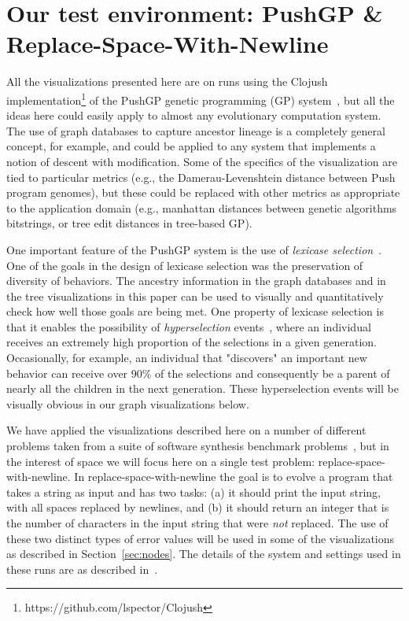 \documentclass{sig-alternate}
\begin{document}
\section{Our test environment: PushGP \& Replace-Space-With-Newline}
\label{sec:RSWN}

All the visualizations presented here are on runs using the Clojush
implementation\footnote{https://github.com/lspector/Clojush} of the 
PushGP genetic programming (GP) system~\cite{spector:2002:GPEM, 1068292}, 
but all the ideas here
could easily apply to almost any evolutionary computation system. The use
of graph databases to capture ancestor lineage is a completely general
concept, for example, and could be applied to any system that implements a
notion of descent with modification. Some of the specifics of the visualization
are tied to particular metrics (e.g., the Damerau-Levenshtein distance
between Push program genomes), but these could be replaced with other
metrics as appropriate to the application domain (e.g., manhattan distances
between genetic algorithms bitstrings, or tree edit distances in
tree-based GP).

One important feature of the PushGP system is the use of \emph{lexicase
selection}~\cite{Helmuth:2015:ieeeTEC}. One of the goals in the design of
lexicase selection was the preservation of diversity of behaviors. The
ancestry information in the graph databases and in the tree visualizations 
in this paper can be used to visually and quantitatively check how
well those goals are being met. One property of lexicase selection is
that it enables the possibility of \emph{hyperselection} events~\cite{Helmuth:2016:GECCO},
where an individual receives an extremely high proportion of the selections
in a given generation. Occasionally, for example, an individual that
"discovers" an important new behavior can receive over 90\% of the selections
and consequently be a parent of nearly all the children in the next generation.
These hyperselection events will be visually obvious in our graph visualizations
below.

We have applied the visualizations described here on a 
number of different problems taken from a suite of software synthesis benchmark 
problems~\cite{Helmuth:2015:GECCO}, but in the interest of space we
will focus here on a single test problem: replace-space-with-newline.
In replace-space-with-newline the goal is to evolve a program that takes a string
as input and has two tasks: (a) it should print the input string, with all spaces
replaced by newlines, and (b) it should return an integer that is the number of
characters in the input string that were \emph{not} replaced. The use of
these two distinct types of error values will be used in some of the visualizations
as described in Section~\ref{sec:nodes}. The details of the system and
settings used in these runs are as described in~\cite{Helmuth:2015:GECCO}.
\end{document}
